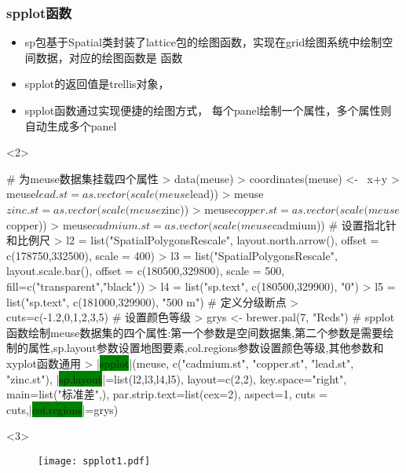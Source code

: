 \subsubsection{spplot函数}
\begin{frame}[t,fragile]{\subsecname}{\subsubsecname}
\begin{itemize} 
\item<1-> sp包基于Spatial类封装了lattice包的绘图函数，实现在grid绘图系统中绘制空间数据，对应的绘图函数是
函数
\item<1-> spplot的返回值是trellis对象，
\item<2-> spplot函数通过实现便捷的绘图方式，
每个panel绘制一个属性，多个属性则自动生成多个panel
\end{itemize}

\begin{overlayarea}{\textwidth}{\textheight}
\begin{onlyenv}<2>
\begin{rcode}
# 为meuse数据集挂载四个属性
> data(meuse)
> coordinates(meuse) <- ~x+y
> meuse$lead.st = as.vector(scale(meuse$lead))
> meuse$zinc.st = as.vector(scale(meuse$zinc))
> meuse$copper.st = as.vector(scale(meuse$copper))
> meuse$cadmium.st = as.vector(scale(meuse$cadmium))
# 设置指北针和比例尺
> l2 = list("SpatialPolygonsRescale", layout.north.arrow(), offset = c(178750,332500), scale = 400)
> l3 = list("SpatialPolygonsRescale", layout.scale.bar(), offset = c(180500,329800), scale = 500, fill=c("transparent","black"))
> l4 = list("sp.text", c(180500,329900), "0")
> l5 = list("sp.text", c(181000,329900), "500 m")
# 定义分级断点
> cuts=c(-1.2,0,1,2,3,5)
# 设置颜色等级
> grys <- brewer.pal(7, "Reds")
# spplot函数绘制meuse数据集的四个属性:第一个参数是空间数据集,第二个参数是需要绘制的属性,sp.layout参数设置地图要素,col.regions参数设置颜色等级,其他参数和xyplot函数通用
> |\colorbox{green}{spplot}|(meuse, c("cadmium.st", "copper.st", "lead.st", "zinc.st"),
        |\colorbox{green}{sp.layout}|=list(l2,l3,l4,l5), layout=c(2,2),
        key.space="right", main=list("标准差",), 
        par.strip.text=list(cex=2), aspect=1,
        cuts = cuts,|\colorbox{green}{col.regions}|=grys)
\end{rcode}
\end{onlyenv}

\begin{onlyenv}<3>
\begin{figure}[ht] \vspace{-20pt}
  \centering 
  \texttt{[image: spplot1.pdf]}
\end{figure}
\end{onlyenv}
\end{overlayarea}
\end{frame}

